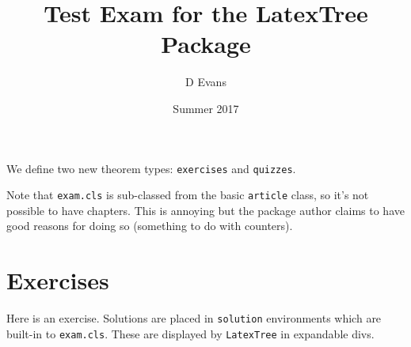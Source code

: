 \documentclass[12pt]{exam}
\title{Test Exam for the LatexTree Package}
\author{D Evans}
\date{Summer 2017}
\def\it{\item}
\def\bit{\begin{itemize}}
\def\eit{\end{itemize}}
\theoremstyle{break}
\begin{document}
\label{exam:latextreetest}
\maketitle

We define two new theorem types: {\tt exercises} and {\tt quizzes}. 

Note that {\tt exam.cls} is sub-classed from the basic {\tt article} class, so it's not possible to have chapters. This is annoying but the package author claims to have good reasons for doing so (something to do with counters). 


\section{Exercises}
Here is an exercise. Solutions are placed in {\tt solution} environments which are built-in to {\tt exam.cls}. These are displayed by {\tt LatexTree} in expandable divs.
\end{document}
